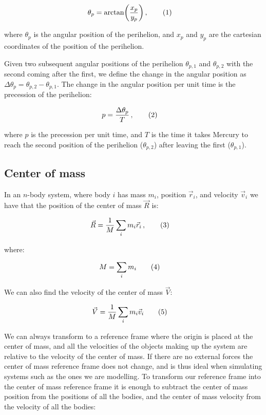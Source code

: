 \documentclass[reprint,english,notitlepage]{revtex4-1}  %
\newcommand\numberthis{\addtocounter{equation}{1}\tag{\theequation}}
\begin{document}
\begin{align*}
\theta_p &= \arctan(\frac{x_p}{y_p}) \, ,\numberthis \label{eq:prec_ang_pos}
\end{align*}

where $\theta_p$ is the angular position of the perihelion, and $x_p$ and $y_p$ are the cartesian coordinates of the position of the perihelion.

Given two subsequent angular positions of the perihelion $\theta_{p,1}$ and $\theta_{p,2}$ with the second coming after the first, we define the change in the angular position as $\Delta \theta_p = \theta_{p,2} - \theta_{p,1}$. The change in the angular position per unit time is the precession of the perihelion:

\begin{align*}
p &= \frac{\Delta \theta_p}{T} \, , \numberthis \label{eq:precession}
\end{align*}

where $p$ is the precession per unit time, and $T$ is the time it takes Mercury to reach the second position of the perihelion ($\theta_{p,2}$) after leaving the first ($\theta_{p,1}$).

\subsection{Center of mass} \label{sec:II:f}

In an $n$-body system, where body $i$ has mass $m_i$, position $\vec{r}_i$, and velocity $\vec{v}_i$ we have that the position of the center of mass $\vec{R}$ is:

\begin{align*}
\vec{R} &= \frac{1}{M}\sum\limits_i m_i \vec{r}_i \, , \numberthis \label{eq:cofm_pos}
\end{align*}

where:

\begin{align*}
M &= \sum\limits_i m_i \numberthis \label{eq:tot_mass}
\end{align*}

We can also find the velocity of the center of mass $\vec{V}$:

\begin{align*}
\vec{V} &= \frac{1}{M} \sum\limits_i m_i \vec{v}_i \numberthis \label{eq:cofm_vel}
\end{align*}

We can always transform to a reference frame where the origin is placed at the center of mass, and all the velocities of the objects making up the system are relative to the velocity of the center of mass. If there are no external forces the center of mass reference frame does not change, and is thus ideal when simulating systems such as the ones we are modelling. To transform our reference frame into the center of mass reference frame it is enough to subtract the center of mass position from the positions of all the bodies, and the center of mass velocity from the velocity of all the bodies:
\end{document}
